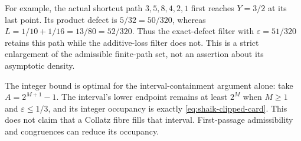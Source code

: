 \documentclass[11pt]{article}
\theoremstyle{remark}\newtheorem{remark}[proposition]{Remark}
\begin{document}
For example, the actual shortcut path \(3,5,8,4,2,1\) first reaches
\(Y=3/2\) at its last point. Its product defect is \(5/32=50/320\),
whereas \(L=1/10+1/16=13/80=52/320\). Thus the exact-defect
filter with \(\varepsilon=51/320\) retains this path while the
additive-loss filter does not. This is a strict enlargement of the
admissible finite-path set, not an assertion about its asymptotic density.

The integer bound is optimal for the interval-containment argument alone:
take \(A=2^{M+1}-1\). The interval's lower endpoint remains at least
\(2^M\) when \(M\ge1\) and \(\varepsilon\le1/3\), and its integer
occupancy is exactly \eqref{eq:shaik-clipped-card}.
This does not claim that a Collatz fibre fills that interval.
First-passage admissibility and congruences can reduce its occupancy.
\end{document}
